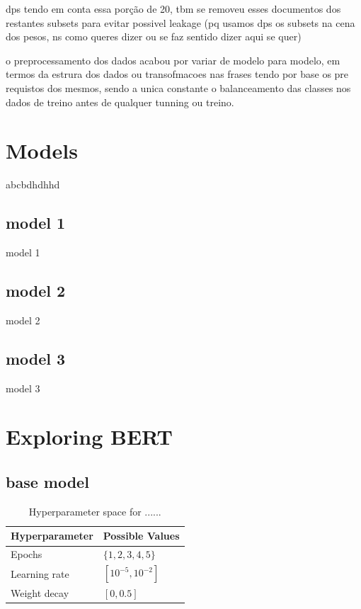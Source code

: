 \documentclass[conference]{IEEEtran}
\begin{document}
dps tendo em conta essa porção de 20, tbm se removeu esses documentos dos restantes subsets para evitar possivel leakage (pq usamos dps os subsets na cena dos pesos, ns como queres dizer ou se faz sentido dizer aqui se quer)

o preprocessamento dos dados acabou por variar de modelo para modelo, em termos da estrura dos dados ou transofmacoes nas frases tendo por base os pre requistos dos mesmos, sendo a unica constante o balanceamento das classes nos dados de treino antes de qualquer tunning ou treino.

\section{Models}

abcbdhdhhd

\subsection{model 1}

model 1


\subsection{model 2}

model 2

\subsection{model 3}

model 3

\section{Exploring BERT}

\subsection{base model}

\begin{table}[H]
\centering
\caption{Hyperparameter space for ......}
\label{parameters_basebert}
\begin{tabular}{ll}
\toprule
\textbf{Hyperparameter} & \textbf{Possible Values} \\
\midrule
Epochs & $\{1,2,3,4,5\}$ \\
Learning rate & $[10^{-5}, 10^{-2}]$ \\
Weight decay & $[0, 0.5]$ \\
\bottomrule
\end{tabular}
\end{table}
\end{document}
